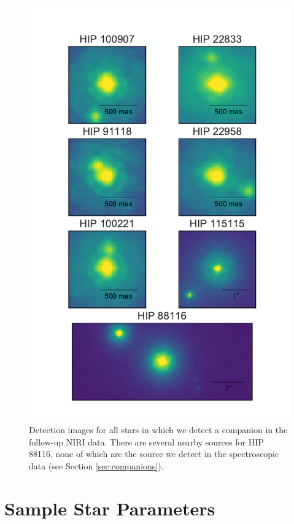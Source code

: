 \documentclass{emulateapj}
\begin{document}
\begin{figure}
\includegraphics[width=\columnwidth]{Imaging_Data.pdf}
\caption{Detection images for all stars in which we detect a companion in the follow-up NIRI data. 
There are several nearby sources for HIP 88116, none of which are the source we detect in the 
spectroscopic data (see Section \ref{sec:companions}).}
\label{fig:images}
\end{figure}





\section{Sample Star Parameters}
\label{sec:sp}
\end{document}
